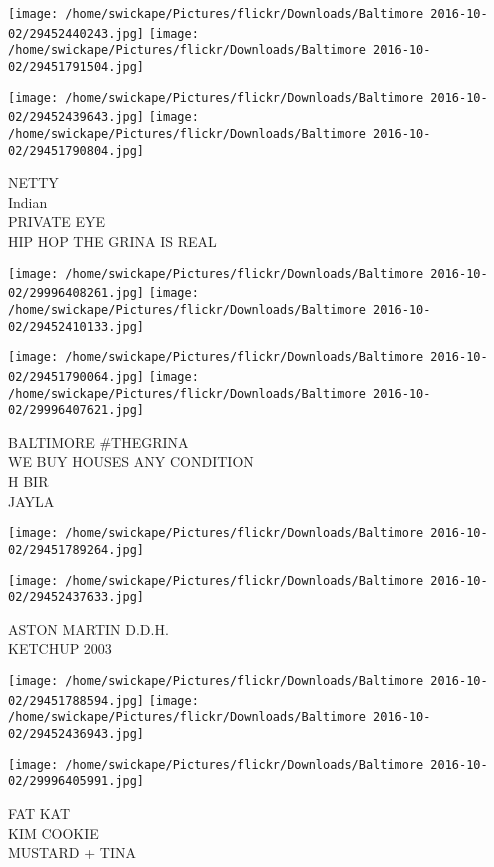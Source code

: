 \documentclass[10pt,letterpaper]{article}
\begin{document}
\texttt{[image: /home/swickape/Pictures/flickr/Downloads/Baltimore 2016-10-02/29452440243.jpg]}
\texttt{[image: /home/swickape/Pictures/flickr/Downloads/Baltimore 2016-10-02/29451791504.jpg]}

\texttt{[image: /home/swickape/Pictures/flickr/Downloads/Baltimore 2016-10-02/29452439643.jpg]}
\texttt{[image: /home/swickape/Pictures/flickr/Downloads/Baltimore 2016-10-02/29451790804.jpg]}

NETTY\\
Indian\\
PRIVATE EYE\\
HIP HOP THE GRINA IS REAL
\pagebreak

\texttt{[image: /home/swickape/Pictures/flickr/Downloads/Baltimore 2016-10-02/29996408261.jpg]}
\texttt{[image: /home/swickape/Pictures/flickr/Downloads/Baltimore 2016-10-02/29452410133.jpg]}

\texttt{[image: /home/swickape/Pictures/flickr/Downloads/Baltimore 2016-10-02/29451790064.jpg]}
\texttt{[image: /home/swickape/Pictures/flickr/Downloads/Baltimore 2016-10-02/29996407621.jpg]}

BALTIMORE \#THEGRINA\\
WE BUY HOUSES ANY CONDITION\\
H BIR\\
JAYLA
\pagebreak

\texttt{[image: /home/swickape/Pictures/flickr/Downloads/Baltimore 2016-10-02/29451789264.jpg]}

\vspace{0.25in}
\texttt{[image: /home/swickape/Pictures/flickr/Downloads/Baltimore 2016-10-02/29452437633.jpg]}

ASTON MARTIN D.D.H.\\
KETCHUP 2003
\pagebreak

\texttt{[image: /home/swickape/Pictures/flickr/Downloads/Baltimore 2016-10-02/29451788594.jpg]}
\texttt{[image: /home/swickape/Pictures/flickr/Downloads/Baltimore 2016-10-02/29452436943.jpg]}

\vspace{0.25in}
\texttt{[image: /home/swickape/Pictures/flickr/Downloads/Baltimore 2016-10-02/29996405991.jpg]}

FAT KAT\\
KIM COOKIE\\
MUSTARD + TINA
\pagebreak
\end{document}
